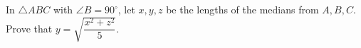 In $\triangle ABC$ with $\angle B=90^\circ$, let $x,y,z$ be the lengths of the medians from $A,B,C$. Prove that $y=\sqrt{\dfrac{x^2+z^2}{5}}$.
